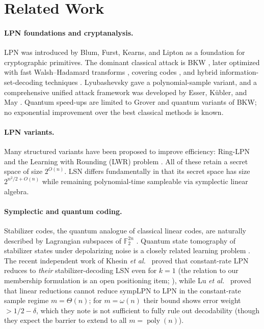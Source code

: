 \documentclass[11pt,a4paper]{article}
\theoremstyle{plain}
\theoremstyle{definition}
\newcommand{\F}{\mathbb{F}}
\newcommand{\etal}{\textit{et al.}}
\begin{document}
\section{Related Work}
\label{sec:related}

\paragraph{LPN foundations and cryptanalysis.}
LPN was introduced by Blum, Furst, Kearns, and Lipton \cite{BFKL94} as a foundation for cryptographic primitives. The dominant classical attack is BKW \cite{BKW03}, later optimized with fast Walsh--Hadamard transforms \cite{LF06}, covering codes \cite{GJL14}, and hybrid information-set-decoding techniques \cite{EKM17}. Lyubashevsky \cite{Lyu05} gave a polynomial-sample variant, and a comprehensive unified attack framework was developed by Esser, K{\"u}bler, and May \cite{EKM17}. Quantum speed-ups are limited to Grover \cite{Gro96} and quantum variants of BKW; no exponential improvement over the best classical methods is known.

\paragraph{LPN variants.}
Many structured variants have been proposed to improve efficiency: Ring-LPN \cite{HKL+12} and the Learning with Rounding (LWR) problem \cite{BPR12}. All of these retain a secret space of size $2^{O(n)}$. LSN differs fundamentally in that its secret space has size $2^{n^2/2 + O(n)}$ while remaining polynomial-time sampleable via symplectic linear algebra.

\paragraph{Symplectic and quantum coding.}
Stabilizer codes, the quantum analogue of classical linear codes, are naturally described by Lagrangian subspaces of $\F_2^{2n}$ \cite{Got97,CRSS98,NC00}. Quantum state tomography of stabilizer states under depolarizing noise is a closely related learning problem \cite{GL22}. The recent independent work of Khesin \etal\ \cite{KLP+25} proved that constant-rate LPN reduces to \emph{their} stabilizer-decoding LSN even for $k=1$ (the relation to our membership formulation is an open positioning item; ), while Lu \etal\ \cite{LPQR26} proved that linear reductions cannot reduce sympLPN to LPN in the constant-rate sample regime $m=\Theta(n)$; for $m=\omega(n)$ their bound shows error weight $>1/2-\delta$, which they note is not sufficient to fully rule out decodability (though they expect the barrier to extend to all $m=\operatorname{poly}(n)$).
\end{document}
